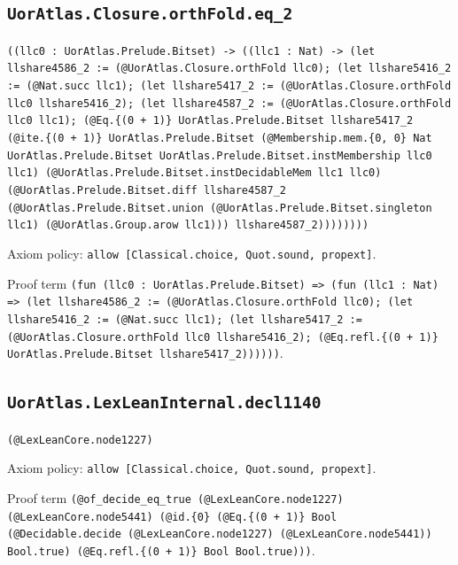 \documentclass[11pt]{article}
\begin{document}
\subsection*{\texttt{UorAtlas.Closure.orthFold.eq\_2}}
\noindent\texttt{((llc0 : UorAtlas.Prelude.Bitset) -> ((llc1 : Nat) -> (let llshare4586\_2 := (@UorAtlas.Closure.orthFold llc0); (let llshare5416\_2 := (@Nat.succ llc1); (let llshare5417\_2 := (@UorAtlas.Closure.orthFold llc0 llshare5416\_2); (let llshare4587\_2 := (@UorAtlas.Closure.orthFold llc0 llc1); (@Eq.\{(0 + 1)\} UorAtlas.Prelude.Bitset llshare5417\_2 (@ite.\{(0 + 1)\} UorAtlas.Prelude.Bitset (@Membership.mem.\{0, 0\} Nat UorAtlas.Prelude.Bitset UorAtlas.Prelude.Bitset.instMembership llc0 llc1) (@UorAtlas.Prelude.Bitset.instDecidableMem llc1 llc0) (@UorAtlas.Prelude.Bitset.diff llshare4587\_2 (@UorAtlas.Prelude.Bitset.union (@UorAtlas.Prelude.Bitset.singleton llc1) (@UorAtlas.Group.arow llc1))) llshare4587\_2))))))))}\par
\noindent Axiom policy: \texttt{allow [Classical.choice, Quot.sound, propext]}.\par
\noindent Proof term \texttt{(fun (llc0 : UorAtlas.Prelude.Bitset) => (fun (llc1 : Nat) => (let llshare4586\_2 := (@UorAtlas.Closure.orthFold llc0); (let llshare5416\_2 := (@Nat.succ llc1); (let llshare5417\_2 := (@UorAtlas.Closure.orthFold llc0 llshare5416\_2); (@Eq.refl.\{(0 + 1)\} UorAtlas.Prelude.Bitset llshare5417\_2))))))}.\par
\subsection*{\texttt{UorAtlas.LexLeanInternal.decl1140}}
\noindent\texttt{(@LexLeanCore.node1227)}\par
\noindent Axiom policy: \texttt{allow [Classical.choice, Quot.sound, propext]}.\par
\noindent Proof term \texttt{(@of\_decide\_eq\_true (@LexLeanCore.node1227) (@LexLeanCore.node5441) (@id.\{0\} (@Eq.\{(0 + 1)\} Bool (@Decidable.decide (@LexLeanCore.node1227) (@LexLeanCore.node5441)) Bool.true) (@Eq.refl.\{(0 + 1)\} Bool Bool.true)))}.\par
\end{document}
